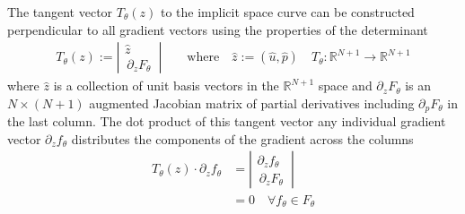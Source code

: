\documentclass{article}[12pt]
\numberwithin{equation}{section}
\begin{document}
The tangent vector $T_{\theta}(z)$ to the implicit space curve can be constructed perpendicular to all gradient vectors using the properties of the determinant
\begin{align}
    T_{\theta}(z):=
    \left|\begin{matrix}
        \hat{z} \\
        \,\partial_{z}F_{\theta}\,
    \end{matrix}\right|
    \qquad\mathrm{where}\quad
    \hat{z}:=(\hat{u},\hat{p})\quad
	T_{\theta} : \mathbb{R}^{N+1}\rightarrow\mathbb{R}^{N+1}
\end{align}
where $\hat{z}$ is a collection of unit basis vectors in the $\mathbb{R}^{N+1}$ space and $\partial_{z}F_{\theta}$ is an $N\times(N+1)$ augmented Jacobian matrix of partial derivatives including $\partial_p F_{\theta}$ in the last column. The dot product of this tangent vector any individual gradient vector $\partial_z f_{\theta}$ distributes the components of the gradient across the columns
\begin{align}
    T_{\theta}(z)\cdot\partial_z f_{\theta}&=
    \left|\begin{matrix}
        \partial_z f_{\theta} \\
        \,\partial_{z}F_{\theta}\,
    \end{matrix}\right|\\&=0 \quad\forall f_{\theta}\in F_\theta
\end{align}
\end{document}
